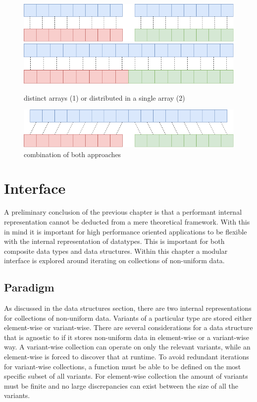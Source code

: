 \documentclass{article}
\begin{document}
\begin{figure}[ht]
    \centering
    \includegraphics[scale=0.3]{variant1}
    \hspace{10pt}
    \includegraphics[scale=0.3]{variant2}
    \caption{distinct arrays (1) or distributed in a single array (2)}
\end{figure}

\begin{figure}[ht]
    \centering
    \includegraphics[scale=0.3]{variant3}
    \caption{combination of both approaches}
\end{figure}

\newpage

\section{Interface}

A preliminary conclusion of the previous chapter is that a performant internal representation cannot be deducted from a mere theoretical framework.
With this in mind it is important for high performance oriented applications to be flexible with the internal representation of datatypes.
This is important for both composite data types and data structures.
Within this chapter a modular interface is explored around iterating on collections of non-uniform data.

\subsection{Paradigm}

As discussed in the data structures section, there are two internal representations for collections of non-uniform data.
Variants of a particular type are stored either element-wise or variant-wise.
There are several considerations for a data structure that is agnostic to if it stores non-uniform data in element-wise or a variant-wise way.
A variant-wise collection can operate on only the relevant variants, while an element-wise is forced to discover that at runtime.
To avoid redundant iterations for variant-wise collections, a function must be able to be defined on the most specific subset of all variants.
For element-wise collection the amount of variants must be finite and no large discrepancies can exist between the size of all the variants.
\end{document}
